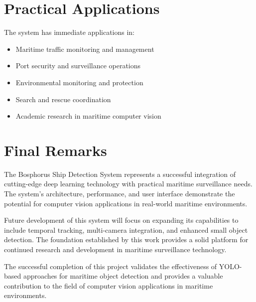 \documentclass[12pt,a4paper]{report}
\begin{document}
\section{Practical Applications}
The system has immediate applications in:
\begin{itemize}
    \item Maritime traffic monitoring and management
    \item Port security and surveillance operations
    \item Environmental monitoring and protection
    \item Search and rescue coordination
    \item Academic research in maritime computer vision
\end{itemize}

\section{Final Remarks}
The Bosphorus Ship Detection System represents a successful integration of cutting-edge deep learning technology with practical maritime surveillance needs. The system's architecture, performance, and user interface demonstrate the potential for computer vision applications in real-world maritime environments.

Future development of this system will focus on expanding its capabilities to include temporal tracking, multi-camera integration, and enhanced small object detection. The foundation established by this work provides a solid platform for continued research and development in maritime surveillance technology.

The successful completion of this project validates the effectiveness of YOLO-based approaches for maritime object detection and provides a valuable contribution to the field of computer vision applications in maritime environments.
\end{document}
